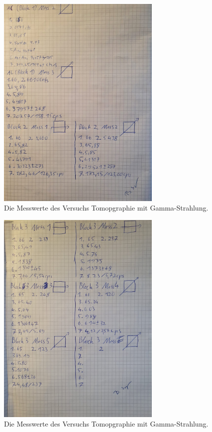 \begin{figure}[h]
    \centering
    \includegraphics[width=0.7\textwidth]{latex/images/Mess2.jpeg}
    \caption{Die Messwerte des Versuchs Tomopgraphie mit Gamma-Strahlung.}
\end{figure}
\begin{figure}[h]
    \centering
    \includegraphics[width=0.7\textwidth]{latex/images/Mess3.jpeg}
    \caption{Die Messwerte des Versuchs Tomopgraphie mit Gamma-Strahlung.}
\end{figure}
